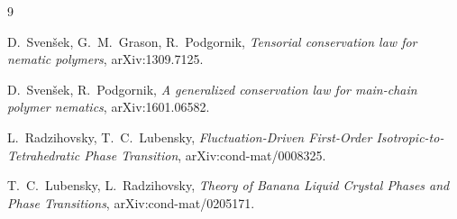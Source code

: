 \begin{thebibliography}{9}\raggedright
{}
D.~Sven\v{s}ek, G.~M.~Grason, R.~Podgornik,
\emph{Tensorial conservation law for nematic polymers},
arXiv:1309.7125.

D.~Sven\v{s}ek, R.~Podgornik,
\emph{A generalized conservation law for main-chain polymer nematics},
arXiv:1601.06582.

L.~Radzihovsky, T.~C.~Lubensky,
\emph{Fluctuation-Driven First-Order Isotropic-to-Tetrahedratic Phase Transition},
arXiv:cond-mat/0008325.

T.~C.~Lubensky, L.~Radzihovsky,
\emph{Theory of Banana Liquid Crystal Phases and Phase Transitions},
arXiv:cond-mat/0205171.
\end{thebibliography}